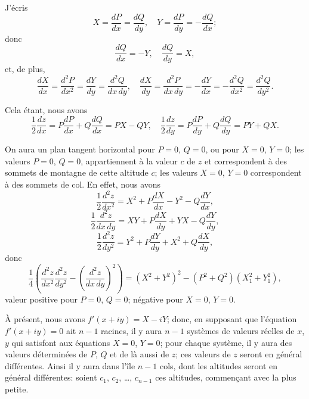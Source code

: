 \documentclass[11pt,a4paper]{book}
\begin{document}
J'\'ecris
\[
X = \frac{dP}{dx} = \frac{dQ}{dy},\quad Y = \frac{dP}{dy} = -\frac{dQ}{dx};
\]
donc
\[
\frac{dQ}{dx} = -Y,\quad \frac{dQ}{dy} = X,
\]
et, de plus,
\[
\frac{dX}{dx} = \frac{d^2P}{dx^2} = \frac{dY}{dy} = \frac{d^2Q}{dx\,dy},\quad \frac{dX}{dy} = \frac{d^2P}{dx\,dy} = -\frac{dY}{dx} = -\frac{d^2Q}{dx^2} = \frac{d^2Q}{dy^2}.
\]

Cela \'etant, nous avons
\[
\frac{1}{2}\frac{dz}{dx} = P\frac{dP}{dx} + Q\frac{dQ}{dx} = PX - QY,\quad \frac{1}{2}\frac{dz}{dy} = P\frac{dP}{dy} + Q\frac{dQ}{dy} = PY + QX.
\]

On aura un plan tangent horizontal pour $P = 0$, $Q = 0$, ou pour $X = 0$, $Y = 0$; les valeurs $P = 0$, $Q = 0$, appartiennent \`a la valeur $c$ de $z$ et correspondent \`a des sommets de montagne de cette altitude $c$; les valeurs $X = 0$, $Y = 0$ correspondent \`a des sommets de col. En effet, nous avons
\[
\frac{1}{2}\frac{d^2z}{dx^2} = X^2 + P\frac{dX}{dx} - Y^2 - Q\frac{dY}{dx},
\]
\[
\frac{1}{2}\frac{d^2z}{dx\,dy} = XY + P\frac{dX}{dy} + YX - Q\frac{dY}{dy},
\]
\[
\frac{1}{2}\frac{d^2z}{dy^2} = Y^2 + P\frac{dY}{dy} + X^2 + Q\frac{dX}{dy},
\]
donc
\[
\frac{1}{4}\left(\frac{d^2z}{dx^2}\frac{d^2z}{dy^2} - \left(\frac{d^2z}{dx\,dy}\right)^2\right) = (X^2 + Y^2)^2 - (P^2 + Q^2)(X_1^2 + Y_1^2),
\]
valeur positive pour $P = 0$, $Q = 0$; n\'egative pour $X = 0$, $Y = 0$.

\`A pr\'esent, nous avons $f'(x + iy) = X - iY$; donc, en supposant que l'\'equation $f'(x + iy) = 0$ ait $n - 1$ racines, il y aura $n-1$ syst\`emes de valeurs r\'eelles de $x$, $y$ qui satisfont aux \'equations $X = 0$, $Y = 0$; pour chaque syst\`eme, il y aura des valeurs d\'etermin\'ees de $P$, $Q$ et de l\`a aussi de $z$; ces valeurs de $z$ seront en g\'en\'eral diff\'erentes. Ainsi il y aura dans l'\^ile $n-1$ cols, dont les altitudes seront en g\'en\'eral diff\'erentes: soient $c_1$, $c_2$, \ldots, $c_{n-1}$ ces altitudes, commen\c{c}ant avec la plus petite.
\end{document}
